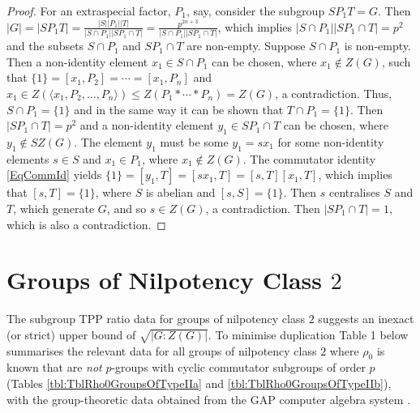 \documentclass{amsart}
\theoremstyle{observation}
\theoremstyle{definition}
\theoremstyle{remark}
\numberwithin{equation}{section}
\begin{document}
\begin{proof}
For an extraspecial factor, $P_1$, say, consider the subgroup $SP_1T = G$. Then $|G| = |SP_1T| = \frac{|S||P_1||T|}{|S \cap P_1||SP_1 \cap T|} = \frac{p^{2n + 3}}{|S \cap P_1||SP_1 \cap T|}$, which implies $|S \cap P_1||SP_1 \cap T| = p^2$ and the subsets $S \cap P_1$ and $SP_1 \cap T$ are non-empty. Suppose $S \cap P_1$ is non-empty. Then a non-identity element $x_1 \in S \cap P_1$ can be chosen, where $x_1 \not\in Z(G)$, such that $\{1\} = [x_1, P_2] = \cdots = [x_1, P_n]$ and $x_1 \in Z(\langle x_1, P_2, \ldots, P_n \rangle) \leq Z(P_1* \cdots * P_n) = Z(G)$, a contradiction. Thus, $S \cap P_1 = \{1\}$ and in the same way it can be shown that $T \cap P_1 = \{1\}$. Then $|SP_1 \cap T| = p^2$ and a non-identity element $y_1 \in SP_1 \cap T$ can be chosen, where $y_1 \not\in SZ(G)$. The element $y_1$ must be some $y_1 = sx_1$ for some non-identity elements $s \in S$ and $x_1 \in P_1$, where $x_1 \not\in Z(G)$. The commutator identity \ref{EqCommId} yields $\{1\} = [y_1, T] = [sx_1, T] = [s, T][x_1, T]$, which implies that $[s, T] = \{1\}$, where $S$ is abelian and $[s, S] = \{1\}$. Then $s$ centralises $S$ and $T$, which generate $G$, and so $s \in Z(G)$, a contradiction. Then $|SP_1 \cap T| = 1$, which is also a contradiction.
\end{proof}

\section{Groups of Nilpotency Class $2$}\label{SecGroupsOfTypeI}

The subgroup TPP ratio data for groups of nilpotency class $2$ \citep[subset of Tables 1-4]{HM} suggests an inexact (or strict) upper bound of $\sqrt{|G:Z(G)|}$. To minimise duplication Table 1 below summarises the relevant data for all groups of nilpotency class $2$ where $\rho_0$ is known that are \emph{not} $p$-groups with cyclic commutator subgroups of order $p$ (Tables \ref{tbl:TblRho0GroupsOfTypeIIa} and \ref{tbl:TblRho0GroupsOfTypeIIb}), with the group-theoretic data obtained from the GAP computer algebra system \citep{GAP}.
\end{document}
